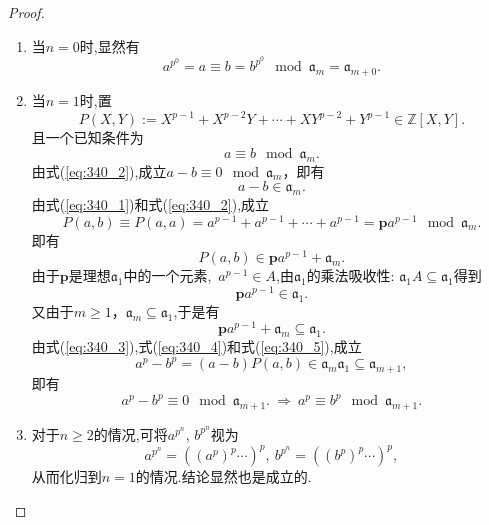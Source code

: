 \documentclass[UTF8, twoside]{ctexart}
\theoremstyle{nonumberplain}
\newtheorem{proof}{\heiti 证明}  %
\theoremstyle{nonumberplain}
\theoremstyle{plain}
\begin{document}
	\begin{proof}
		\ 
		\begin{enumerate}
			\item 当$n=0$时,显然有
			\[
			{{a}^{{{p}^{0}}}}=a\equiv b={{b}^{{{p}^{0}}}}\ \bmod {{\mathfrak{a}}_{m}}={{\mathfrak{a}}_{m+0}}.
			\]
			\vskip 0.3cm
			
			\item 
			当$n=1$时,置
			\begin{equation} \label{eq:340_1}
				P\left( X,Y \right):={{X}^{p-1}}+{{X}^{p-2}}Y+\cdots +X{{Y}^{p-2}}+{{Y}^{p-1}}\in \mathbb{Z}\left[ X,Y \right].
			\end{equation}
			且一个已知条件为
			\begin{equation} \label{eq:340_2}
				a\equiv b\ \bmod {{\mathfrak{a}}_{m}}.
			\end{equation}
			由式(\ref{eq:340_2}),成立$a-b\equiv 0
			\ \bmod {{\mathfrak{a}}_{m}}$，即有
			\begin{equation} \label{eq:340_3}
				a-b\in {{\mathfrak{a}}_{m}}.
			\end{equation}
			由式(\ref{eq:340_1})和式(\ref{eq:340_2}),成立
			\[
			P\left( a,b \right)\equiv P\left( a,a \right)={{a}^{p-1}}+{{a}^{p-1}}+\cdots +{{a}^{p-1}}=\bm{p}{{a}^{p-1}}
			\ \bmod {{\mathfrak{a}}_{m}}.
			\]
			即有
			\begin{equation} \label{eq:340_4}
				P\left( a,b \right)\in \bm{p}{{a}^{p-1}}+{{\mathfrak{a}}_{m}}.
			\end{equation}
			由于$\bm{p}$是理想${{\mathfrak{a}}_{1}}$中的一个元素,\ ${{a}^{p-1}}\in A$,由${{\mathfrak{a}}_{1}}$的乘法吸收性: ${{\mathfrak{a}}_{1}}A\subseteq {{\mathfrak{a}}_{1}}$得到
			\[
			\bm{p}{{a}^{p-1}}\in {{\mathfrak{a}}_{1}}.
			\]
			又由于$m\ge 1$，${{\mathfrak{a}}_{m}}\subseteq {{\mathfrak{a}}_{1}}$,于是有
			\begin{equation} \label{eq:340_5}
				\bm{p}{{a}^{p-1}}+{{\mathfrak{a}}_{m}}\subseteq {{\mathfrak{a}}_{1}}.
			\end{equation}
			由式(\ref{eq:340_3}),式(\ref{eq:340_4})和式(\ref{eq:340_5}),成立
			\[
			{{a}^{p}}-{{b}^{p}}=\left( a-b \right)P\left( a,b \right)\in {{\mathfrak{a}}_{m}}{{\mathfrak{a}}_{1}}\subseteq {{\mathfrak{a}}_{m+1}},
			\]
			即有
			\[
			{{a}^{p}}-{{b}^{p}}\equiv 0
			\ \bmod {{\mathfrak{a}}_{m+1}}.
			\ \Longrightarrow \ 
			{{a}^{p}}\equiv {{b}^{p}}
			\ \bmod {{\mathfrak{a}}_{m+1}}.
			\]
			\vskip 0.3cm
			
			\item
			对于$n\ge 2$的情况,可将${{a}^{{{p}^{n}}}}$, ${{b}^{{{p}^{n}}}}$视为
			\[
			{{a}^{{{p}^{n}}}}={{\left( {{\left( {{a}^{p}} \right)}^{p}}\cdots  \right)}^{p}},
			\ {{b}^{{{p}^{n}}}}={{\left( {{\left( {{b}^{p}} \right)}^{p}}\cdots  \right)}^{p}},
			\]
			从而化归到$n=1$的情况.结论显然也是成立的.
		\end{enumerate}
	\end{proof}
	\vskip 0.7cm
	
\end{document}
